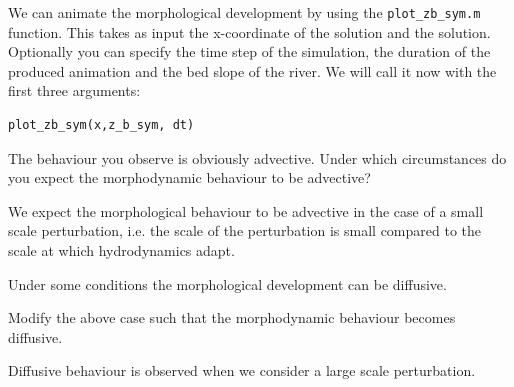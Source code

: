 \documentclass[a4paper]{article}
\begin{document}
We can animate the morphological development by using the \lstinline{plot_zb_sym.m} function. This takes as input the x-coordinate of the solution and the solution. Optionally you can specify the time step of the simulation, the duration of the produced animation and the bed slope of the river.
We will call it now with the first three arguments:
\begin{lstlisting}
plot_zb_sym(x,z_b_sym, dt) 
\end{lstlisting}
\begin{exercise}
  The behaviour you observe is obviously advective. Under which circumstances do you expect the morphodynamic behaviour to be advective?
\end{exercise}
\begin{solution}
  We expect the morphological behaviour to be advective in the case of a small scale perturbation, i.e. the scale of the perturbation is small compared to the scale at which hydrodynamics adapt.
\end{solution}
Under some conditions the morphological development can be diffusive.
\begin{exercise}
  Modify the above case such that the morphodynamic behaviour becomes diffusive.
\end{exercise}
\begin{solution}
    Diffusive behaviour is observed when we consider a large scale perturbation.
\end{solution}

\printsolutions
\end{document}
